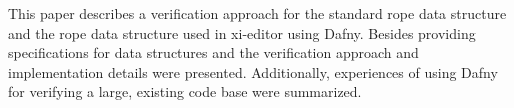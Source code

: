 This paper describes a verification approach for the standard rope data structure and the rope data structure used in xi-editor using Dafny.
Besides providing specifications for data structures and the verification approach and implementation details were presented.
Additionally, experiences of using Dafny for verifying a large, existing code base were summarized.
